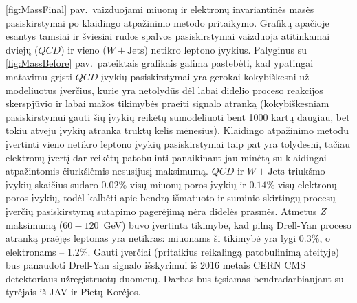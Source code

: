 \documentclass[a4paper, 12pt, oneside]{article}
\newcommand{\WJets}{W\! +\!\mathrm{Jets}}
\newcommand{\QCD}{QC\! D}
\begin{document}
\ref{fig:MassFinal} pav.\ vaizduojami miuonų ir elektronų invariantinės masės pasiskirstymai po klaidingo atpažinimo
metodo pritaikymo.
Grafikų apačioje esantys tamsiai ir šviesiai rudos spalvos pasiskirstymai vaizduoja atitinkamai dviejų ($\QCD$) ir vieno
($\WJets$) netikro leptono įvykius.
Palyginus su \ref{fig:MassBefore} pav.\ pateiktais grafikais galima pastebėti, kad ypatingai matavimu grįsti $\QCD$ įvykių
pasiskirstymai yra gerokai kokybiškesni už modeliuotus įverčius, kurie yra netolydūs dėl labai didelio proceso reakcijos
skerspjūvio ir labai mažos tikimybės praeiti signalo atranką (kokybiškesniam pasiskirstymui gauti
šių įvykių reikėtų sumodeliuoti bent 1000 kartų daugiau, bet tokiu atveju įvykių atranka truktų kelis mėnesius).
Klaidingo atpažinimo metodu įvertinti vieno netikro leptono įvykių pasiskirstymai taip pat yra tolydesni,
tačiau elektronų įvertį dar reikėtų patobulinti panaikinant jau minėtą su klaidingai atpažintomis čiurkšlėmis nesusijusį maksimumą.
$\QCD$ ir $\WJets$ triukšmo įvykių skaičius sudaro $0.02\%$ visų miuonų poros įvykių ir $0.14\%$ visų elektronų poros įvykių,
todėl kalbėti apie bendrą išmatuoto ir suminio skirtingų procesų įverčių pasiskirstymų sutapimo pagerėjimą nėra didelės prasmės.
Atmetus $Z$ maksimumą ($60-120$~GeV) buvo įvertinta tikimybė, kad pilną Drell-Yan proceso atranką praėjęs leptonas yra netikras:
miuonams ši tikimybė yra lygi $0.3\%$, o elektronams -- $1.2\%$.
Gauti įverčiai (pritaikius reikalingą patobulinimą ateityje) bus panaudoti Drell-Yan signalo išskyrimui iš 2016 metais CERN CMS
detektoriaus užregistruotų duomenų.
Darbas bus tęsiamas bendradarbiaujant su tyrėjais iš JAV ir Pietų Korėjos.

\newpage
\end{document}
